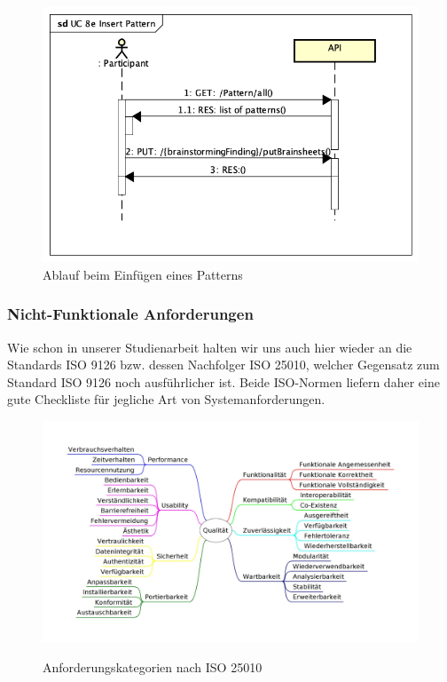 \begin{figure}[h]
	\centering
	\includegraphics[width=1\linewidth]{img/anforderungen/Seq-Insert-Pattern}
	\caption[Ablauf beim Einfügen eines Patterns]{Ablauf beim Einfügen eines Patterns}
	\label{fig:Seq-Insert-Pattern}
\end{figure}

\newpage
\subsubsection{Nicht-Funktionale Anforderungen}
Wie schon in unserer Studienarbeit halten wir uns auch hier wieder an die Standards ISO 9126\cite{ISO9126} bzw. dessen Nachfolger ISO 25010\cite{ISO9126_ISO25010}, welcher Gegensatz zum Standard ISO 9126 noch ausführlicher ist. Beide ISO-Normen liefern daher eine gute Checkliste für jegliche Art von Systemanforderungen.

\begin{figure}[h]
	\centering
	\includegraphics[width=1\linewidth]{img/anforderungen/quality}
	\caption[Anforderungskategorien nach ISO 25010]{Anforderungskategorien nach  ISO 25010}\cite{ISO25010_Bild}
	\label{fig:ISO 25010}
\end{figure}

